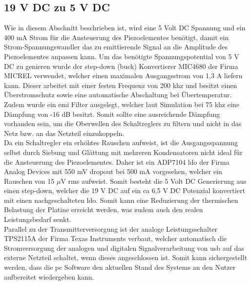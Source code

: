 \subsection*{19 V DC zu 5 V DC}
Wie in diesem Abschnitt beschrieben ist, wird eine 5 Volt DC Spannung und ein 400 mA Strom für die Ansteuerung des Piezoelementes benötigt, damit ein Strom-Spannungswandler das zu emittierende Signal an die Amplitude des Piezoelementes anpassen kann. Um das benötigte Spannungspotential von 5 V DC zu genieren wurde der step-down (buck) Konvertierer MIC4680 der Firma MICREL verwendet\cite{MIC4680}, welcher einen maximalen Ausgangsstrom von 1,3 A liefern kann. Dieser arbeitet mit einer festen Frequenz von 200 \ac{khz} und besitzt einen Überstromschutz sowie eine automatische Abschaltung bei Übertemperatur.\\
Zudem wurde ein \ac{emi} Filter ausgelegt, welcher laut Simulation bei 75 \ac{khz} eine Dämpfung von -16 dB besitzt. Somit sollte eine ausreichende Dämpfung vorhanden sein, um die Oberwellen des Schaltreglers zu filtern und nicht in das Netz bzw. an das Netzteil einzukoppeln.\\ %
Da ein Schaltregler ein erhöhtes Rauschen aufweist, ist die Ausgangsspannung selbst durch Siebung und Glättung mit mehreren Kondensatoren nicht ideal für die Ansteuerung des Piezoelementes. Daher ist ein ADP7104 \ac{ldo} der Firma Analog Devices mit 550 mV dropout bei 500 mA vorgesehen\cite{ADP7104}, welcher ein Rauschen von 15 $\mu$V rms aufweist. Somit besteht die 5 Volt DC Generierung aus einen step-down, welcher die 19 V DC auf ein \ac{ca} 6,5 V DC Potenzial konvertiert mit einen nachgeschalteten \ac{ldo}. Somit kann eine Reduzierung der thermischen Belastung der Platine erreicht werden, was zudem auch den realen Leistungsbedarf senkt.\\
Parallel zu der Transmitterversorgung ist der analoge Leistungsschalter TPS2115A der Firma Texas Instruments verbaut\cite{ti_tps2115a}, welcher automatisch die Stromversorgung der analogen und digitalen Signalverarbeitung von \ac{usb} auf das externe Netzteil schaltet, wenn dieses angeschlossen ist. Somit kann sichergestellt werden, dass die \ac{pc} Software den aktuellen Stand des Systems an den Nutzer aufbereitet wiedergeben kann.
